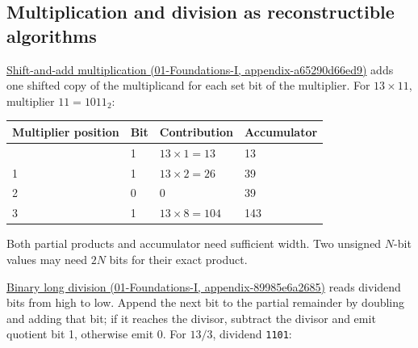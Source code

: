 \subsection{Multiplication and division as reconstructible algorithms}\label{05-engine-i-ch001-multiplication-and-division-as-reconstructible-algorithms}

\href{../01-Foundations-I/main.pdf\#nameddest=appendix-a65290d66ed9}{Shift-and-add multiplication (01-Foundations-I, appendix-a65290d66ed9)} adds one shifted copy of the multiplicand for each set bit of the multiplier. For \(13\times11\), multiplier \(11=1011_2\):

{\def\LTcaptype{none} %
\begin{longtable}[]{@{}llll@{}}
\toprule\noalign{}
Multiplier position & Bit & Contribution & Accumulator \\
\midrule\noalign{}
\endhead
\bottomrule\noalign{}
\endlastfoot
0 & 1 & \(13\times1=13\) & 13 \\
1 & 1 & \(13\times2=26\) & 39 \\
2 & 0 & 0 & 39 \\
3 & 1 & \(13\times8=104\) & 143 \\
\end{longtable}
}

Both partial products and accumulator need sufficient width. Two unsigned \(N\)-bit values may need \(2N\) bits for their exact product.

\href{../01-Foundations-I/main.pdf\#nameddest=appendix-89985e6a2685}{Binary long division (01-Foundations-I, appendix-89985e6a2685)} reads dividend bits from high to low. Append the next bit to the partial remainder by doubling and adding that bit; if it reaches the divisor, subtract the divisor and emit quotient bit 1, otherwise emit 0. For \(13/3\), dividend \texttt{1101}:

